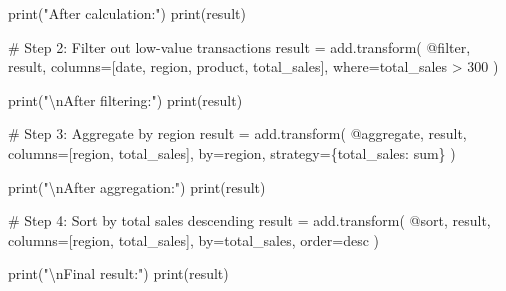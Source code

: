 \documentclass[
  letterpaper,
]{scrbook}
\newenvironment{Shaded}{\begin{snugshade}}{\end{snugshade}}
\newcommand{\BuiltInTok}[1]{\textcolor[rgb]{0.00,0.23,0.31}{#1}}
\newcommand{\CharTok}[1]{\textcolor[rgb]{0.13,0.47,0.30}{#1}}
\newcommand{\CommentTok}[1]{\textcolor[rgb]{0.37,0.37,0.37}{#1}}
\newcommand{\NormalTok}[1]{\textcolor[rgb]{0.00,0.23,0.31}{#1}}
\newcommand{\OperatorTok}[1]{\textcolor[rgb]{0.37,0.37,0.37}{#1}}
\newcommand{\StringTok}[1]{\textcolor[rgb]{0.13,0.47,0.30}{#1}}
\begin{document}
\begin{Shaded}
\begin{Highlighting}[]
\BuiltInTok{print}\NormalTok{(}\StringTok{"After calculation:"}\NormalTok{)}
\BuiltInTok{print}\NormalTok{(result)}

\CommentTok{\# Step 2: Filter out low{-}value transactions}
\NormalTok{result }\OperatorTok{=}\NormalTok{ add.transform(}
    \StringTok{\textquotesingle{}@filter\textquotesingle{}}\NormalTok{,}
\NormalTok{    result,}
\NormalTok{    columns}\OperatorTok{=}\NormalTok{[}\StringTok{\textquotesingle{}date\textquotesingle{}}\NormalTok{, }\StringTok{\textquotesingle{}region\textquotesingle{}}\NormalTok{, }\StringTok{\textquotesingle{}product\textquotesingle{}}\NormalTok{, }\StringTok{\textquotesingle{}total\_sales\textquotesingle{}}\NormalTok{],}
\NormalTok{    where}\OperatorTok{=}\StringTok{\textquotesingle{}total\_sales \textgreater{} 300\textquotesingle{}}
\NormalTok{)}

\BuiltInTok{print}\NormalTok{(}\StringTok{"}\CharTok{\textbackslash{}n}\StringTok{After filtering:"}\NormalTok{)}
\BuiltInTok{print}\NormalTok{(result)}

\CommentTok{\# Step 3: Aggregate by region}
\NormalTok{result }\OperatorTok{=}\NormalTok{ add.transform(}
    \StringTok{\textquotesingle{}@aggregate\textquotesingle{}}\NormalTok{,}
\NormalTok{    result,}
\NormalTok{    columns}\OperatorTok{=}\NormalTok{[}\StringTok{\textquotesingle{}region\textquotesingle{}}\NormalTok{, }\StringTok{\textquotesingle{}total\_sales\textquotesingle{}}\NormalTok{],}
\NormalTok{    by}\OperatorTok{=}\StringTok{\textquotesingle{}region\textquotesingle{}}\NormalTok{,}
\NormalTok{    strategy}\OperatorTok{=}\NormalTok{\{}\StringTok{\textquotesingle{}total\_sales\textquotesingle{}}\NormalTok{: }\StringTok{\textquotesingle{}sum\textquotesingle{}}\NormalTok{\}}
\NormalTok{)}

\BuiltInTok{print}\NormalTok{(}\StringTok{"}\CharTok{\textbackslash{}n}\StringTok{After aggregation:"}\NormalTok{)}
\BuiltInTok{print}\NormalTok{(result)}

\CommentTok{\# Step 4: Sort by total sales descending}
\NormalTok{result }\OperatorTok{=}\NormalTok{ add.transform(}
    \StringTok{\textquotesingle{}@sort\textquotesingle{}}\NormalTok{,}
\NormalTok{    result,}
\NormalTok{    columns}\OperatorTok{=}\NormalTok{[}\StringTok{\textquotesingle{}region\textquotesingle{}}\NormalTok{, }\StringTok{\textquotesingle{}total\_sales\textquotesingle{}}\NormalTok{],}
\NormalTok{    by}\OperatorTok{=}\StringTok{\textquotesingle{}total\_sales\textquotesingle{}}\NormalTok{,}
\NormalTok{    order}\OperatorTok{=}\StringTok{\textquotesingle{}desc\textquotesingle{}}
\NormalTok{)}

\BuiltInTok{print}\NormalTok{(}\StringTok{"}\CharTok{\textbackslash{}n}\StringTok{Final result:"}\NormalTok{)}
\BuiltInTok{print}\NormalTok{(result)}
\end{Highlighting}
\end{Shaded}
\end{document}
